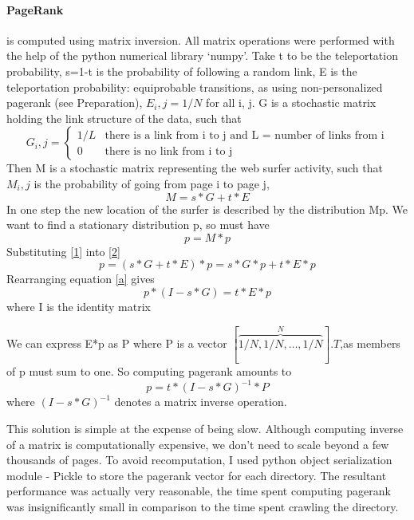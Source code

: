 \documentclass[12pt,twoside,notitlepage]{report}
\begin{document}
\paragraph{PageRank} is computed using matrix inversion. All matrix operations
were performed with the help of the python numerical library `numpy'.  Take t
to be the teleportation probability, s=1-t is the probability of following a
random link, E is the teleportation probability: equiprobable transitions, as
using non-personalized pagerank (see Preparation), \(E_i,j = 1/N\) for all i,
j. G is a stochastic matrix holding the link structure of the data, such that 
\begin{equation*}
  G_i,j = \begin{cases}
    1/L & \text{there is a link from i to j and L = number of links from i}\\
    0   & \text{there is no link from i to j}
  \end{cases}
\end{equation*}
Then M is a stochastic matrix representing the web surfer activity, such
that \(M_i,j\) is the probability of going from page i to page j, 
\begin{equation} \label{1}
  M = s*G +t*E
\end{equation}
In one step the new location of the surfer is described by the distribution Mp.
We want to find a stationary distribution p, so must have
\begin{equation}\label{2}
  p = M*p
\end{equation}
Substituting \ref{1} into \ref{2}
\begin{equation} \label{a}
  p = (s*G+t*E)*p = s*G*p + t*E*p
\end{equation}
Rearranging equation \ref{a} gives
\begin{equation}
  p*(I-s*G) = t*E*p
\end{equation}
where I is the identity matrix

We can express E*p as P where P is a vector
\([\overbrace{1/N,1/N,\dots,1/N}^N].T\),as members of p must sum to one.
So computing pagerank amounts to
\begin{equation}
p  = t*(I-s*G)^{-1}*P
\end{equation}
where \((I-s*G)^{-1}\) denotes a matrix inverse operation.

This solution is simple at the expense of being slow. Although computing
inverse of a matrix is computationally expensive, we don't need to scale beyond
a few thousands of pages.  To avoid recomputation, I used python object
serialization module - Pickle to store the pagerank vector for each directory.
The resultant performance was actually very reasonable, the time spent
computing pagerank was insignificantly small in comparison to the time spent
crawling the directory.
\end{document}
